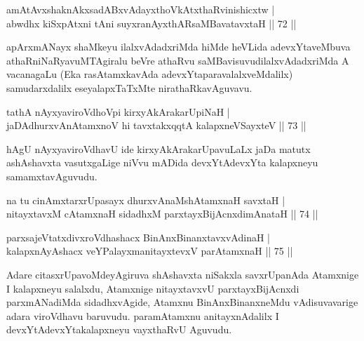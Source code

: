 
\begin{shl}
amAtAvxshaknAkxsadABxvAdayxthoVkAtxthaRvinishicxtw  | \\
abwdhx kiSxpAtxni tAni suyxranAyxthARsaMBavatavxtaH \hfill||  72 ||  
\end{shl}

\begin{artha}
apArxmANayx shaMkeyu ilalxvAdadxriMda hiMde heVLida \mdash  adevxYtaveMbuva athaRniNaRyavuMTAgiralu beVre athaRvu saMBavisuvudilalxvAdadxriMda A vacanagaLu (Eka rasAtamxkavAda adevxYtaparavalalxveMdalilx) samudarxdalilx eseyalapxTaTxMte nirathaRkavAguvavu.
\end{artha}

\begin{shl}
tathA nAyxyaviroVdhoV\s pi kirxyAkArakarUpiNaH  | \\
jaDAdhurxvAnAtamxnoV hi tavxtakxqqtA kalapxneVSayxteV ||  73 ||  
\end{shl}

\begin{artha}
hAgU nAyxyaviroVdhavU ide \mdash  kirxyAkArakarUpavuLaLx jaDa matutx ashAshavxta vasutxgaLige niVvu mADida devxYtAdevxYta kalapxneyu samamxtavAguvudu.
\end{artha}

\begin{shl}
na tu cinAmxtarxrUpasayx dhurxvAnaMshAtamxnaH savxtaH  | \\
nitayxtavxM cA\s \s tamxnaH sidadhxM parxtayxBijAcnxdimAnataH \hfill||  74 ||  
\end{shl}

\begin{shl}
parxsajeVtatxdivxroVdhashacx BinAnxBinanxtavxvAdinaH  | \\
kalapxnAyAshacx veYPalayxmanitayxtevxV parAtamxnaH \hfill||  75 ||  
\end{shl}

\begin{artha}
Adare citasxrUpavoMdeyAgiruva shAshavxta niSakxla savxrUpanAda Atamxnige I kalapxneyu salalxdu, Atamxnige nitayxtavxvU parxtayxBijAcnxdi parxmANadiMda sidadhxvAgide, Atamxnu BinAnxBinanxneMdu vAdisuvavarige adara viroVdhavu baruvudu. paramAtamxnu anitayxnAdalilx I devxYtAdevxYtakalapxneyu vayxthaRvU Aguvudu.
\end{artha}


